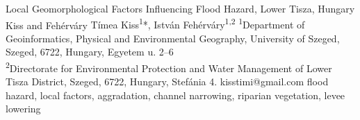 \abstract
{Local Geomorphological Factors Influencing Flood Hazard, Lower Tisza, Hungary} 
{Kiss and Fehérváry} 
{Tímea Kiss\textsuperscript{1}*, István Fehérváry\textsuperscript{1,2}} 
{\TLtag} 
{
\textsuperscript{1}Department of Geoinformatics, Physical and Environmental Geography, University of Szeged, Szeged, 6722, Hungary, Egyetem u. 2–6\\
\textsuperscript{2}Directorate for Environmental Protection and Water Management of Lower Tisza District,
	Szeged, 6722, Hungary, Stefánia 4.
}
{kisstimi@gmail.com}  %
{flood hazard, local factors, aggradation, channel narrowing, riparian vegetation, levee lowering}
